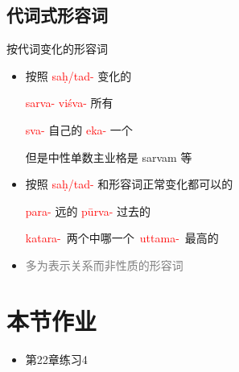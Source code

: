 \documentclass[17pt]{beamer}
\newcommand{\nounstem}[1]{\textcolor{red}{#1\nobreakdash-}}
\newcommand{\fullpada}[1]{\textcolor{OliveGreen}{#1}}
\newcommand{\notsoimportant}[1]{\textcolor{gray}{#1}}
\begin{document}
\subsection{代词式形容词}
\begin{frame}{按代词变化的形容词}
  \begin{itemize}
    \item 按照 \nounstem{saḥ/tad} 变化的
    
    \nounstem{sarva} \nounstem{viśva} 所有 
    
    \nounstem{sva} 自己的 \nounstem{eka} 一个
    
    但是中性单数主业格是 \fullpada{sarvam} 等
    \item 按照 \nounstem{saḥ/tad} 和形容词正常变化都可以的

    \nounstem{para} 远的 \nounstem{pūrva} 过去的

    \mbox{\nounstem{katara} 两个中哪一个 \nounstem{uttama} 最高的}
    \item \notsoimportant{多为表示关系而非性质的形容词}
  \end{itemize}
\end{frame}


\section{本节作业}

\begin{frame}{\insertsection }
  \begin{itemize}
    \item
      第22章练习4
  \end{itemize}
\end{frame}  
\end{document}
